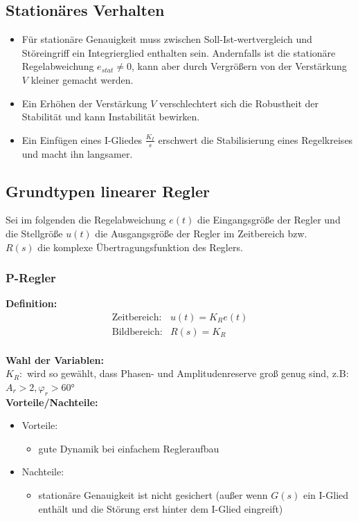 \documentclass[10pt,a4paper]{article}
\begin{document}
\subsection{Stationäres Verhalten}
\begin{itemize}
	\item Für stationäre Genauigkeit muss zwischen Soll-Ist-wertvergleich und Störeingriff ein Integrierglied enthalten sein. Andernfalls ist die stationäre Regelabweichung $e_{stat} ≠ 0$, kann aber durch Vergrößern von der Verstärkung $V$ kleiner gemacht werden.
	\item Ein Erhöhen der Verstärkung $V$ verschlechtert sich die Robustheit der Stabilität und kann Instabilität bewirken.
	\item Ein Einfügen eines I-Gliedes $\frac{K_I}{s}$ erschwert die Stabilisierung eines Regelkreises und macht ihn langsamer.
\end{itemize}

\subsection{Grundtypen linearer Regler}
Sei im folgenden die Regelabweichung $e(t)$ die Eingangsgröße der Regler und die Stellgröße $u(t)$ die Ausgangsgröße der Regler im Zeitbereich bzw. \\
$R(s)$ die komplexe Übertragungsfunktion des Reglers.

\subsubsection{P-Regler}
\textbf{Definition:}
$$
	\begin{array}{ll}
	\text{Zeitbereich:} & u(t) = K_R e(t) \\
	\text{Bildbereich:} & R(s) = K_R
	\end{array}
$$ \\

\textbf{Wahl der Variablen:} \\
$K_R:$ wird so gewählt, dass Phasen- und Amplitudenreserve groß genug sind, z.B: $A_r > 2, \varphi_r > 60°$ \\

\textbf{Vorteile/Nachteile:}
\begin{itemize}
	\item Vorteile:
	\begin{itemize}
		\item gute Dynamik bei einfachem Regleraufbau
	\end{itemize}
	\item Nachteile:
	\begin{itemize}
		\item stationäre Genauigkeit ist nicht gesichert (außer wenn $G(s)$ ein I-Glied enthält und die Störung erst hinter dem I-Glied eingreift)
	\end{itemize}
\end{itemize}
\end{document}

